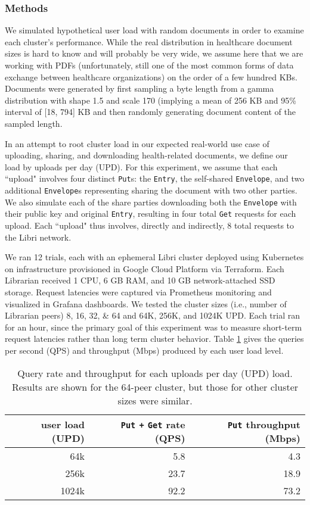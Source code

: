 \documentclass[10pt]{article}
\newcommand{\ttt}[1]{\texttt{#1}}
\def\Entry{\ttt{Entry}}
\def\Envelope{\ttt{Envelope}}
\def\Put{\ttt{Put}}
\def\Get{\ttt{Get}}
\begin{document}
\subsubsection{Methods}
We simulated hypothetical user load with random documents in order to examine each cluster's performance. While the real distribution in healthcare document sizes is hard to know and will probably be very wide, we assume here that we are working with PDFs (unfortunately, still one of the most common forms of data exchange between healthcare organizations) on the order of a few hundred KBs. Documents were generated by first sampling a byte length from a gamma distribution with shape 1.5 and scale 170 (implying a mean of 256 KB and 95\% interval of [18, 794] KB and then randomly generating document content of the sampled length.

In an attempt to root cluster load in our expected real-world use case of uploading, sharing, and downloading health-related documents, we define our load by uploads per day (UPD). For this experiment, we assume that each ``upload" involves four distinct \ttt{Put}s: the \Entry{}, the self-shared \Envelope{}, and two additional \Envelope{}s representing sharing the document with two other parties. We also simulate each of the share parties downloading both the \Envelope{} with their public key and original \Entry{}, resulting in four total \texttt{Get} requests for each upload. Each ``upload" thus involves, directly and indirectly, 8 total requests to the Libri network. 

We ran 12 trials, each with an ephemeral Libri cluster deployed using Kubernetes on infrastructure provisioned in Google Cloud Platform via Terraform. Each Librarian received 1 CPU, 6 GB RAM, and 10 GB network-attached SSD storage. Request latencies were captured via Prometheus monitoring and visualized in Grafana dashboards. We tested the cluster sizes (i.e., number of Librarian peers) 8, 16, 32, \& 64 and 64K, 256K, and 1024K UPD. Each trial ran for an hour, since the primary goal of this experiment was to measure short-term request latencies rather than long term cluster behavior. Table \ref{tbl:updload} gives the queries per second (QPS) and throughput (Mbps) produced by each user load level. 

\begin{table}[t]
\centering
\begin{tabular}{rrr}
	\toprule
	user load (UPD) & \Put{} \ttt{+} \Get{} rate (QPS) & \Put{} throughput (Mbps) \\ \midrule
	64k & 5.8 & 4.3 \\
	256k & 23.7 & 18.9 \\
	1024k & 92.2 & 73.2 \\ \bottomrule
\end{tabular}
\caption{Query rate and throughput for each uploads per day (UPD) load. Results are shown for the 64-peer cluster, but those for other cluster sizes were similar.}
\label{tbl:updload}
\end{table}
\end{document}
